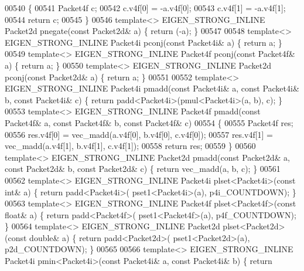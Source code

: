 \begin{DoxyCode}
{00540 \{
00541   Packet4f c;
00542   c.v4f[0] = -a.v4f[0];
00543   c.v4f[1] = -a.v4f[1];
00544   \textcolor{keywordflow}{return} c;
00545 \}
00546 \textcolor{keyword}{template}<> EIGEN\_STRONG\_INLINE Packet2d pnegate(\textcolor{keyword}{const} Packet2d& a) \{ \textcolor{keywordflow}{return} (-a); \}
00547 
00548 \textcolor{keyword}{template}<> EIGEN\_STRONG\_INLINE Packet4i pconj(\textcolor{keyword}{const} Packet4i& a) \{ \textcolor{keywordflow}{return} a; \}
00549 \textcolor{keyword}{template}<> EIGEN\_STRONG\_INLINE Packet4f pconj(\textcolor{keyword}{const} Packet4f& a) \{ \textcolor{keywordflow}{return} a; \}
00550 \textcolor{keyword}{template}<> EIGEN\_STRONG\_INLINE Packet2d pconj(\textcolor{keyword}{const} Packet2d& a) \{ \textcolor{keywordflow}{return} a; \}
00551 
00552 \textcolor{keyword}{template}<> EIGEN\_STRONG\_INLINE Packet4i pmadd(\textcolor{keyword}{const} Packet4i& a, \textcolor{keyword}{const} Packet4i& b, \textcolor{keyword}{const} Packet4i& c) \{ \textcolor{keywordflow}{
      return} padd<Packet4i>(pmul<Packet4i>(a, b), c); \}
00553 \textcolor{keyword}{template}<> EIGEN\_STRONG\_INLINE Packet4f pmadd(\textcolor{keyword}{const} Packet4f& a, \textcolor{keyword}{const} Packet4f& b, \textcolor{keyword}{const} Packet4f& c)
00554 \{
00555   Packet4f res;
00556   res.v4f[0] = vec\_madd(a.v4f[0], b.v4f[0], c.v4f[0]);
00557   res.v4f[1] = vec\_madd(a.v4f[1], b.v4f[1], c.v4f[1]);
00558   \textcolor{keywordflow}{return} res;
00559 \}
00560 \textcolor{keyword}{template}<> EIGEN\_STRONG\_INLINE Packet2d pmadd(\textcolor{keyword}{const} Packet2d& a, \textcolor{keyword}{const} Packet2d& b, \textcolor{keyword}{const} Packet2d& c) \{ \textcolor{keywordflow}{
      return} vec\_madd(a, b, c); \}
00561 
00562 \textcolor{keyword}{template}<> EIGEN\_STRONG\_INLINE Packet4i plset<Packet4i>(\textcolor{keyword}{const} \textcolor{keywordtype}{int}& a)    \{ \textcolor{keywordflow}{return} padd<Packet4i>(
      pset1<Packet4i>(a), p4i\_COUNTDOWN); \}
00563 \textcolor{keyword}{template}<> EIGEN\_STRONG\_INLINE Packet4f plset<Packet4f>(\textcolor{keyword}{const} \textcolor{keywordtype}{float}& a)  \{ \textcolor{keywordflow}{return} padd<Packet4f>(
      pset1<Packet4f>(a), p4f\_COUNTDOWN); \}
00564 \textcolor{keyword}{template}<> EIGEN\_STRONG\_INLINE Packet2d plset<Packet2d>(\textcolor{keyword}{const} \textcolor{keywordtype}{double}& a) \{ \textcolor{keywordflow}{return} padd<Packet2d>(
      pset1<Packet2d>(a), p2d\_COUNTDOWN); \}
00565 
00566 \textcolor{keyword}{template}<> EIGEN\_STRONG\_INLINE Packet4i pmin<Packet4i>(\textcolor{keyword}{const} Packet4i& a, \textcolor{keyword}{const} Packet4i& b) \{ \textcolor{keywordflow}{return} 
}
\end{DoxyCode}
